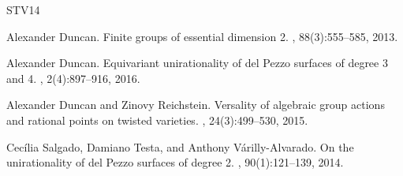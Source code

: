 \documentclass{amsart}
\theoremstyle{definition}
\theoremstyle{remark}
\numberwithin{equation}{section}
\begin{document}
\begin{thebibliography}{STV14}

Alexander Duncan.
\newblock Finite groups of essential dimension 2.
, 88(3):555--585, 2013.

Alexander Duncan.
\newblock Equivariant unirationality of del Pezzo surfaces of degree 3 and 4.
, 2(4):897--916, 2016.

Alexander Duncan and Zinovy Reichstein.
\newblock Versality of algebraic group actions and rational points on twisted varieties.
, 24(3):499--530, 2015.

Cec\'ilia Salgado, Damiano Testa, and Anthony V\'arilly-Alvarado.
\newblock On the unirationality of del Pezzo surfaces of degree 2.
, 90(1):121--139, 2014.

\end{thebibliography}
\end{document}
